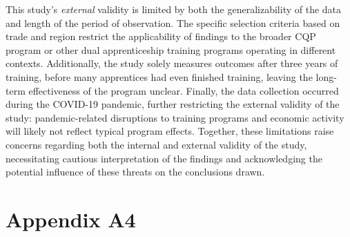 \documentclass[
  a4paper, twoside, 12pt]{book}
\renewcommand{\hl}[1]{#1}
\begin{document}
\hl{This study's \textit{external} validity is limited by both the generalizability of the data and length of the period of observation. The specific selection criteria based on trade and region restrict the applicability of findings to the broader CQP program or other dual apprenticeship training programs operating in different contexts. Additionally, the study solely measures outcomes after three years of training, before many apprentices had even finished training, leaving the long-term effectiveness of the program unclear. Finally, the data collection occurred during the COVID-19 pandemic, further restricting the external validity of the study: pandemic-related disruptions to training programs and economic activity will likely not reflect typical program effects. Together, these limitations raise concerns regarding both the internal and external validity of the study, necessitating cautious interpretation of the findings and acknowledging the potential influence of these threats on the conclusions drawn.} 

\newpage
{}

\printbibliography[segment=\therefsegment,heading=subbibintoc,title={References}]\nocite{hauschildt2018}
\newpage

\hypertarget{cqp-appendix-a}{%
\section*{Appendix A4}\label{cqp-appendix-a}}


\setcounter{figure}{0}
\renewcommand{\thefigure}{A4.\arabic{figure}}
\setcounter{table}{0}
\renewcommand{\thetable}{A4.\arabic{table}}
\end{document}
